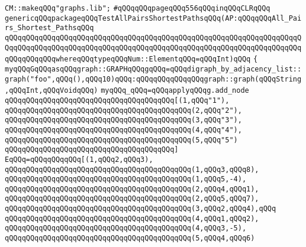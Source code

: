 \label{src/lib/graph/test5.pkg}
\verb|CM::makeqQQq"graphs.lib";|\newline
\newline
\verb|#qQQqqQQqpageqQQq556qQQqinqQQqCLRqQQq|\newline
\verb|genericqQQqpackageqQQqTestAllPairsShortestPathsqQQq(AP:qQQqqQQqAll_Pairs_Shortest_PathsqQQq|\newline
\verb|qQQqqQQqqQQqqQQqqQQqqQQqqQQqqQQqqQQqqQQqqQQqqQQqqQQqqQQqqQQqqQQqqQQqqQQqqQQqqQQqqQQqqQQqqQQqqQQqqQQqqQQqqQQqqQQqqQQqqQQqqQQqqQQqqQQqqQQqqQQqqQQqqQQqqQQqwhereqQQqtypeqQQqNum::ElementqQQq=qQQqInt)qQQq|\newline
\verb|{|\newline
\verb|myqQQqGqQQqasqQQqgraph::GRAPHqQQqgqQQq=qQQqdigraph_by_adjacency_list::graph("foo",qQQq(),qQQq10)qQQq:qQQqqQQqqQQqqQQqgraph::graph(qQQqString,qQQqInt,qQQqVoidqQQq)|\newline
\verb|myqQQq_qQQq=qQQqapplyqQQqg.add_node|\newline
\verb|qQQqqQQqqQQqqQQqqQQqqQQqqQQqqQQqqQQqqQQq[(1,qQQq"1"),|\newline
\verb|qQQqqQQqqQQqqQQqqQQqqQQqqQQqqQQqqQQqqQQqqQQq(2,qQQq"2"),|\newline
\verb|qQQqqQQqqQQqqQQqqQQqqQQqqQQqqQQqqQQqqQQqqQQq(3,qQQq"3"),|\newline
\verb|qQQqqQQqqQQqqQQqqQQqqQQqqQQqqQQqqQQqqQQqqQQq(4,qQQq"4"),|\newline
\verb|qQQqqQQqqQQqqQQqqQQqqQQqqQQqqQQqqQQqqQQqqQQq(5,qQQq"5")|\newline
\verb|qQQqqQQqqQQqqQQqqQQqqQQqqQQqqQQqqQQqqQQq]|\newline
\verb|EqQQq=qQQqqQQqqQQq[(1,qQQq2,qQQq3),|\newline
\verb|qQQqqQQqqQQqqQQqqQQqqQQqqQQqqQQqqQQqqQQqqQQq(1,qQQq3,qQQq8),|\newline
\verb|qQQqqQQqqQQqqQQqqQQqqQQqqQQqqQQqqQQqqQQqqQQq(1,qQQq5,-4),|\newline
\verb|qQQqqQQqqQQqqQQqqQQqqQQqqQQqqQQqqQQqqQQqqQQq(2,qQQq4,qQQq1),|\newline
\verb|qQQqqQQqqQQqqQQqqQQqqQQqqQQqqQQqqQQqqQQqqQQq(2,qQQq5,qQQq7),|\newline
\verb|qQQqqQQqqQQqqQQqqQQqqQQqqQQqqQQqqQQqqQQqqQQq(3,qQQq2,qQQq4),qQQq|\newline
\verb|qQQqqQQqqQQqqQQqqQQqqQQqqQQqqQQqqQQqqQQqqQQq(4,qQQq1,qQQq2),|\newline
\verb|qQQqqQQqqQQqqQQqqQQqqQQqqQQqqQQqqQQqqQQqqQQq(4,qQQq3,-5),|\newline
\verb|qQQqqQQqqQQqqQQqqQQqqQQqqQQqqQQqqQQqqQQqqQQq(5,qQQq4,qQQq6)|\newline
